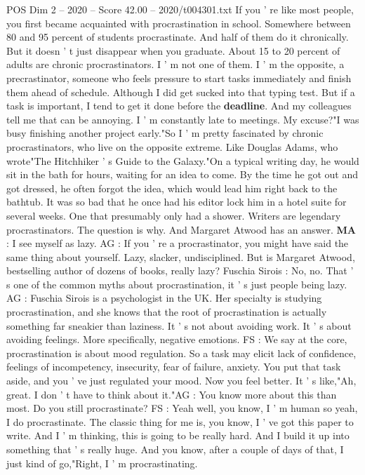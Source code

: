 \begin{textsample}{POS Dim 2 – 2020 – Score 42.00 – 2020/t004301.txt}
If you ' re like most people, you first became acquainted with procrastination in school.
Somewhere between 80 and 95 percent of students procrastinate.
And half of them do it chronically.
But it doesn ' t just disappear when you graduate.
About 15 to 20 percent of adults are chronic procrastinators.
I ' m not one of them.
I ' m the opposite, a precrastinator, someone who feels pressure to start tasks immediately and finish them ahead of schedule.
Although I did get sucked into that typing test.
But if a task is important, I tend to get it done before the \textbf{deadline}.
And my colleagues tell me that can be annoying.
I ' m constantly late to meetings.
My excuse?"I was busy finishing another project early."So I ' m pretty fascinated by chronic procrastinators, who live on the opposite extreme.
Like Douglas Adams, who wrote"The Hitchhiker ' s Guide to the Galaxy."On a typical writing day, he would sit in the bath for hours, waiting for an idea to come.
By the time he got out and got dressed, he often forgot the idea, which would lead him right back to the bathtub.
It was so bad that he once had his editor lock him in a hotel suite for several weeks.
One that presumably only had a shower.
Writers are legendary procrastinators.
The question is why.
And Margaret Atwood has an answer. \textbf{MA} : I see myself as lazy.
AG : If you ' re a procrastinator, you might have said the same thing about yourself.
Lazy, slacker, undisciplined.
But is Margaret Atwood, bestselling author of dozens of books, really lazy?
Fuschia Sirois : No, no.
That ' s one of the common myths about procrastination, it ' s just people being lazy.
AG : Fuschia Sirois is a psychologist in the UK.
Her specialty is studying procrastination, and she knows that the root of procrastination is actually something far sneakier than laziness.
It ' s not about avoiding work.
It ' s about avoiding feelings.
More specifically, negative emotions.
FS : We say at the core, procrastination is about mood regulation.
So a task may elicit lack of confidence, feelings of incompetency, insecurity, fear of failure, anxiety.
You put that task aside, and you ' ve just regulated your mood.
Now you feel better.
It ' s like,"Ah, great.
I don ' t have to think about it."AG : You know more about this than most.
Do you still procrastinate?
FS : Yeah well, you know, I ' m human so yeah, I do procrastinate.
The classic thing for me is, you know, I ' ve got this paper to write.
And I ' m thinking, this is going to be really hard.
And I build it up into something that ' s really huge.
And you know, after a couple of days of that, I just kind of go,"Right, I ' m procrastinating.

\end{textsample}
